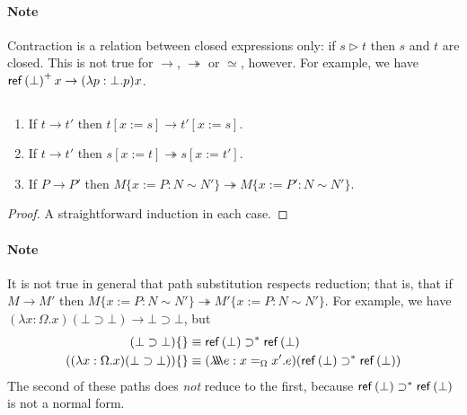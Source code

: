 \paragraph{Note}
Contraction is a relation between closed expressions only: if $s \rhd t$ then $s$ and $t$ are closed.  This is not true for $\rightarrow$, $\twoheadrightarrow$ or $\simeq$, however.  For example, we have $\mathsf{ref} \left( {\bot} \right)^+ x \rightarrow (\lambda p:\bot.p)x$.

\begin{lm}
$ $
\begin{enumerate}
\item
If $t \rightarrow t'$ then $t[x:=s] \rightarrow t'[x:=s]$.
\item
If $t \rightarrow t'$ then $s[x:=t] \twoheadrightarrow s[x:=t']$.
\item
If $P \rightarrow P'$ then $M \{ x:= P : N \sim N' \} \twoheadrightarrow M \{ x:=P' : N \sim N' \}$.
\end{enumerate}
\end{lm}

\begin{proof}
A straightforward induction in each case.
\end{proof}

\paragraph{Note}
It is not true in general that path substitution respects reduction; that is, that if $M \rightarrow M'$ then $M \{ x:=P : N \sim N' \} \twoheadrightarrow M' \{ x:=P : N \sim N' \}$.  For example, we have
$(\lambda x:\Omega.x)(\bot \supset \bot) \rightarrow \bot \supset \bot$,
but
\begin{align*}
(\bot \supset \bot) \{ \} & \equiv \mathsf{ref} \left( {\bot} \right) \supset^* \mathsf{ref} \left( {\bot} \right) \\
((\lambda x:\Omega.x)(\bot \supset \bot)) \{ \} & \equiv (\lambda \!\! \lambda \!\! \lambda e:x =_\Omega x'.e)(\mathsf{ref} \left( {\bot} \right) \supset^* \mathsf{ref} \left( {\bot} \right))
\end{align*}
The second of these paths does \emph{not} reduce to the first, because $\mathsf{ref} \left( {\bot} \right) \supset^* \mathsf{ref} \left( {\bot} \right)$ is not a normal form.

